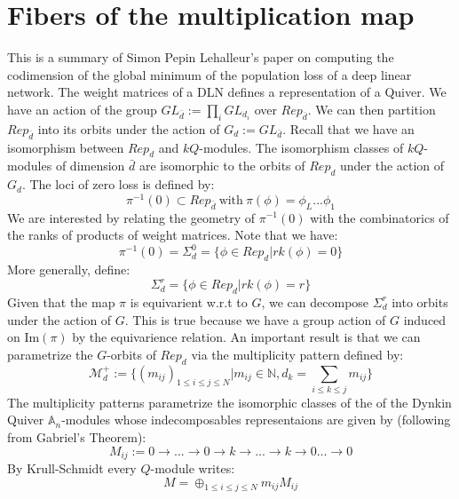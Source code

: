 \documentclass{article}
\theoremstyle{definition}
\begin{document}
\section{Fibers of the multiplication map}
This is a summary of Simon Pepin Lehalleur's paper on computing the codimension of the global minimum of the population loss of a deep linear network.
The weight matrices of a DLN defines a representation of a Quiver. We have an action of the group $GL_{\bar{d}} := \prod_i GL_{d_i}$ over $Rep_{\bar{d}}$. We can then partition $Rep_{\bar{d}}$ into its orbits under the action of $G_d:=GL_{\bar{d}}$. Recall that we have an isomorphism between $Rep_d$ and $kQ$-modules. The isomorphism classes of $kQ$-modules of dimension $\bar{d}$ are isomorphic to the orbits of $Rep_d$ under the action of $G_d$. The loci of zero loss is defined by:
\begin{equation*}
    \pi^{-1}(0) \subset Rep_{\bar{d}} \ \text{with} \ \pi(\phi) = \phi_L...\phi_1
\end{equation*}
We are interested by relating the geometry of $\pi^{-1}(0)$ with the combinatorics of the ranks of products of weight matrices. Note that we have:
\begin{equation*}
    \pi^{-1}(0) = \Sigma_d^0 = \{\phi\in Rep_d| rk(\phi)=0\}
\end{equation*}
More generally, define:
\begin{equation*}
    \Sigma_d^r = \{\phi\in Rep_d| rk(\phi)=r\}
\end{equation*}
Given that the map $\pi$ is equivarient w.r.t to $G$, we can decompose $\Sigma_d^r$ into orbits under the action of $G$. This is true because we have a group action of $G$ induced on $\text{Im}(\pi)$ by the equivarience relation. An important result is that we can parametrize the $G$-orbits of $Rep_d$ via the multiplicity pattern defined by:
\begin{equation*}
    \mathcal{M}^+_d := \{(m_{ij})_{1\leq i \leq j \leq N}| m_{ij} \in \mathbb{N}, d_k = \sum_{i\leq k \leq j} m_{ij} \}
\end{equation*}
The multiplicity patterns parametrize the isomorphic classes of the of the Dynkin Quiver $\mathbb{A}_n$-modules whose indecomposables representaions are given by (following from Gabriel's Theorem):
\begin{equation*}
   M_{ij} := 0 \to .. .\to  0 \to  k \to  ... \to  k \to  0 ... \to  0
\end{equation*}
By Krull-Schmidt every $Q$-module writes:
\begin{equation*}
    M = \oplus_{1\leq i \leq j \leq N} m_{ij}M_{ij}
\end{equation*}
\end{document}
